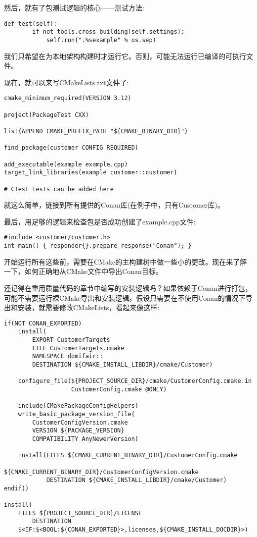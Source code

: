 然后，就有了包测试逻辑的核心——测试方法:

\begin{lstlisting}[style=stylePython]
	def test(self):
		if not tools.cross_building(self.settings):
			self.run(".%sexample" % os.sep)
\end{lstlisting}

我们只希望在为本地架构构建时才运行它。否则，可能无法运行已编译的可执行文件。

现在，就可以来写CMakeLists.txt文件了:

\begin{lstlisting}[style=styleCMake]
cmake_minimum_required(VERSION 3.12)

project(PackageTest CXX)

list(APPEND CMAKE_PREFIX_PATH "${CMAKE_BINARY_DIR}")

find_package(customer CONFIG REQUIRED)

add_executable(example example.cpp)
target_link_libraries(example customer::customer)

# CTest tests can be added here
\end{lstlisting}

就这么简单，链接到所有提供的Conan库(在例子中，只有Customer库)。

最后，用足够的逻辑来检查包是否成功创建了example.cpp文件:

\begin{lstlisting}[style=styleCXX]
#include <customer/customer.h>
int main() { responder{}.prepare_response("Conan"); }
\end{lstlisting}

开始运行所有这些前，需要在CMake的主构建树中做一些小的更改。现在来了解一下，如何正确地从CMake文件中导出Conan目标。 


还记得在重用质量代码的章节中编写的安装逻辑吗？如果依赖于Conan进行打包，可能不需要运行裸CMake导出和安装逻辑。假设只需要在不使用Conan的情况下导出和安装，就需要修改CMakeLists，看起来像这样:

\begin{lstlisting}[style=styleCMake]
if(NOT CONAN_EXPORTED)
	install(
		EXPORT CustomerTargets
		FILE CustomerTargets.cmake
		NAMESPACE domifair::
		DESTINATION ${CMAKE_INSTALL_LIBDIR}/cmake/Customer)
	
	configure_file(${PROJECT_SOURCE_DIR}/cmake/CustomerConfig.cmake.in
				   CustomerConfig.cmake @ONLY)
	
	include(CMakePackageConfigHelpers)
	write_basic_package_version_file(
		CustomerConfigVersion.cmake
		VERSION ${PACKAGE_VERSION}
		COMPATIBILITY AnyNewerVersion)
	
	install(FILES ${CMAKE_CURRENT_BINARY_DIR}/CustomerConfig.cmake
				${CMAKE_CURRENT_BINARY_DIR}/CustomerConfigVersion.cmake
			DESTINATION ${CMAKE_INSTALL_LIBDIR}/cmake/Customer)
endif()

install(
	FILES ${PROJECT_SOURCE_DIR}/LICENSE
	 	DESTINATION
	$<IF:$<BOOL:${CONAN_EXPORTED}>,licenses,${CMAKE_INSTALL_DOCDIR}>)
\end{lstlisting}

